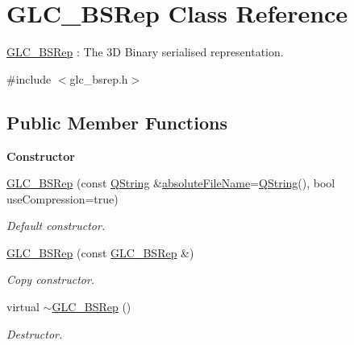 \hypertarget{class_g_l_c___b_s_rep}{\section{G\-L\-C\-\_\-\-B\-S\-Rep Class Reference}
\label{class_g_l_c___b_s_rep}
}


\hyperlink{class_g_l_c___b_s_rep}{G\-L\-C\-\_\-\-B\-S\-Rep} \-: The 3\-D Binary serialised representation.  




{\ttfamily \#include $<$glc\-\_\-bsrep.\-h$>$}

\subsection*{Public Member Functions}
\begin{Indent}{\bf Constructor}\par
\begin{DoxyCompactItemize}
\item 
\hyperlink{class_g_l_c___b_s_rep_a2dc8d956e8e7ca9bb0bd6f59e53b2219}{G\-L\-C\-\_\-\-B\-S\-Rep} (const \hyperlink{group___u_a_v_objects_plugin_gab9d252f49c333c94a72f97ce3105a32d}{Q\-String} \&\hyperlink{class_g_l_c___b_s_rep_a6383f6a2c3379ba7b1c49fae46c14881}{absolute\-File\-Name}=\hyperlink{group___u_a_v_objects_plugin_gab9d252f49c333c94a72f97ce3105a32d}{Q\-String}(), bool use\-Compression=true)
\begin{DoxyCompactList}\small\item\em Default constructor. \end{DoxyCompactList}\item 
\hyperlink{class_g_l_c___b_s_rep_a6727e548e41189df73c274dd7d2e87be}{G\-L\-C\-\_\-\-B\-S\-Rep} (const \hyperlink{class_g_l_c___b_s_rep}{G\-L\-C\-\_\-\-B\-S\-Rep} \&)
\begin{DoxyCompactList}\small\item\em Copy constructor. \end{DoxyCompactList}\item 
virtual \hyperlink{class_g_l_c___b_s_rep_a63b949bc8546ff3215e6525fdbd924f4}{$\sim$\-G\-L\-C\-\_\-\-B\-S\-Rep} ()
\begin{DoxyCompactList}\small\item\em Destructor. \end{DoxyCompactList}\end{DoxyCompactItemize}
\end{Indent}
